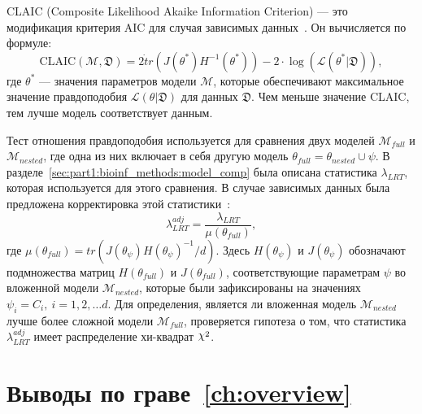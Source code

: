 CLAIC (Composite Likelihood Akaike Information Criterion) --- это модификация критерия AIC для случая зависимых данных~\cite{coffman2016computationally, varin2005note}.
Он вычисляется по формуле:
$$\text{CLAIC}(\mathcal{M},\mathfrak{D})=2\dot tr(J(\theta^*)H^{−1}(\theta^*))−2\cdot \log(\mathcal{L}(\theta^*|\mathfrak{D})),$$
где $\theta^*$ --- значения параметров модели $\mathcal{M}$, которые обеспечивают максимальное значение правдоподобия $\mathcal{L}(\theta|\mathfrak{D})$ для данных $\mathfrak{D}$.
Чем меньше значение CLAIC, тем лучше модель соответствует данным.

Тест отношения правдоподобия используется для сравнения двух моделей $\mathcal{M}_{full}$ и $\mathcal{M}_{nested}$, где одна из них включает в себя другую модель $\theta_{full} = \theta_{nested} \cup \psi$.
В разделе~\ref{sec:part1:bioinf_methods:model_comp} была описана статистика $\lambda_{LRT}$, которая используется для этого сравнения.
В случае зависимых данных была предложена корректировка этой статистики~\cite{coffman2016computationally, rotnitzky1990hypothesis}:
$$\lambda_{LRT}^{adj} = \frac{\lambda_{LRT}}{\mu(\theta_{full})},$$
где $\mu(\theta_{full}) = tr(J(\theta_\psi)H(\theta_\psi)^{-1} / d)$. 
Здесь $H(\theta_\psi)$ и $J(\theta_\psi)$ обозначают подмножества матриц $H(\theta_{full})$ и $J(\theta_{full})$, соответствующие параметрам $\psi$ во вложенной модели $\mathcal{M}_{nested}$, которые были зафиксированы на значениях $\psi_i = C_i,\ i=1,2,\dots d$.
Для определения, является ли вложенная модель $\mathcal{M}_{nested}$ лучше более сложной модели $\mathcal{M}_{full}$, проверяется гипотеза о том, что статистика $\lambda^{adj}_{LRT}$ имеет распределение хи-квадрат $\rchi^2$.


\section*{Выводы по граве~\ref{ch:overview}}


